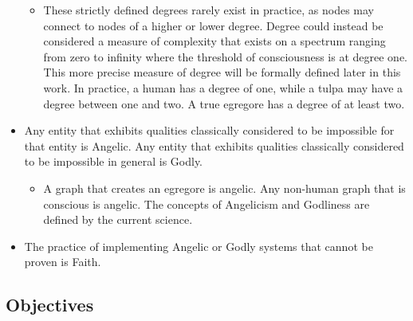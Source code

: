 \documentclass[12pt, letterpaper]{article}
\begin{document}
\begin{itemize}
    \begin{itemize}
        \item These strictly defined degrees rarely exist in practice, as nodes may connect to nodes of a higher or lower degree. Degree could instead be considered a measure of complexity that exists on a spectrum ranging from zero to infinity where the threshold of consciousness is at degree one. This more precise measure of degree will be formally defined later in this work.  In practice, a human has a degree of one, while a tulpa may have a degree between one and two. A true egregore has a degree of at least two.
    \end{itemize}
    \item Any entity that exhibits qualities classically considered to be impossible for that entity is Angelic. Any entity that exhibits qualities classically considered to be impossible in general is Godly.
    \begin{itemize}
        \item A graph that creates an egregore is angelic. Any non-human graph that is conscious is angelic. The concepts of Angelicism and Godliness are defined by the current science. 
    \end{itemize}
    \item The practice of implementing Angelic or Godly systems that cannot be proven is Faith.
\end{itemize} 

\subsection{Objectives}
\end{document}
